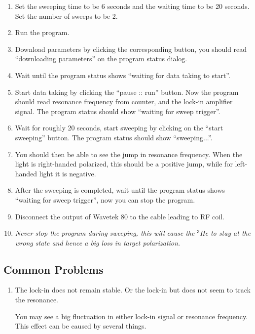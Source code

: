 {\begin{enumerate} 
\item Set the sweeping time to be 6 seconds and the waiting time to be 20 seconds.  
Set the number of sweeps to be 2.
\item Run the program.
\item Download parameters by clicking the corresponding button, you should read 
``downloading parameters'' on the program status dialog.
\item Wait until the program status shows ``waiting for data taking to start''.
\item Start data taking by clicking the ``pause :: run'' button.  Now the program 
should read resonance frequency from counter, and the lock-in amplifier signal.  
The program status should show ``waiting for sweep trigger''.
\item Wait for roughly 20 seconds, start sweeping by clicking on the ``start
sweeping'' button. The program status should show ``sweeping...''.
\item You should then be able to see the jump in resonance frequency.  When the light
is right-handed polarized, this should be a positive jump, while for left-handed
light it is negative.
\item After the sweeping is completed, wait until the program status shows ``waiting 
for sweep trigger'', now you can stop the program.

\item Disconnect the output of Wavetek 80 to the cable leading to RF coil.

\item \emph{Never stop the program during sweeping, this will cause the $^3$He
 to stay 
at the wrong state and hence a big loss in target polarization. }
\end{enumerate}        

\subsection{Common Problems}

\begin{enumerate}


\item The lock-in does not remain stable.  
Or the lock-in but does not seem to track the resonance.

You may see a big fluctuation in either lock-in signal or resonance frequency.
This effect can be caused by several things.  


\end{enumerate}}
